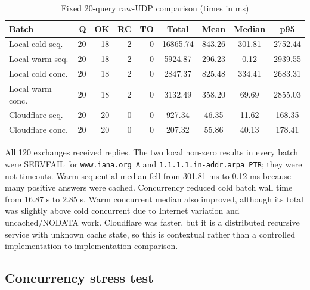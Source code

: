 \documentclass[11pt,a4paper]{article}
\newcommand{\code}[1]{\texttt{#1}}
\begin{document}
\begin{table}[htbp]
    \centering
    \scriptsize
    \setlength{\tabcolsep}{2.2pt}
    \caption{Fixed 20-query raw-UDP comparison (times in ms)}
    \label{tab:performance}
    \vspace{0.3em}

    \begin{tabular}{
        lrrrr
        S[table-format=5.2]
        S[table-format=4.2]
        S[table-format=4.2]
        S[table-format=4.2]
    }
        \toprule
        \textbf{Batch}
        & \textbf{Q}
        & \textbf{OK}
        & \textbf{RC}
        & \textbf{TO}
        & {\textbf{Total}}
        & {\textbf{Mean}}
        & {\textbf{Median}}
        & {\textbf{p95}} \\
        \midrule
        Local cold seq. & 20 & 18 & 2 & 0
            & 16865.74 & 843.26 & 301.81 & 2752.44 \\
        Local warm seq. & 20 & 18 & 2 & 0
            & 5924.87 & 296.23 & 0.12 & 2939.55 \\
        Local cold conc. & 20 & 18 & 2 & 0
            & 2847.37 & 825.48 & 334.41 & 2683.31 \\
        Local warm conc. & 20 & 18 & 2 & 0
            & 3132.49 & 358.20 & 69.69 & 2855.03 \\
        Cloudflare seq. & 20 & 20 & 0 & 0
            & 927.34 & 46.35 & 11.62 & 168.35 \\
        Cloudflare conc. & 20 & 20 & 0 & 0
            & 207.32 & 55.86 & 40.13 & 178.41 \\
        \bottomrule
    \end{tabular}
\end{table}

All 120 exchanges received replies. The two local non-zero results in every
batch were SERVFAIL for \code{www.iana.org A} and
\code{1.1.1.1.in-addr.arpa PTR}; they were not timeouts. Warm sequential median
fell from 301.81 ms to 0.12 ms because many positive answers were cached.
Concurrency reduced cold batch wall time from 16.87 s to 2.85 s. Warm concurrent
median also improved, although its total was slightly above cold concurrent due
to Internet variation and uncached/NODATA work. Cloudflare was faster, but it is
a distributed recursive service with unknown cache state, so this is contextual
rather than a controlled implementation-to-implementation comparison.

\subsection*{Concurrency stress test}
\end{document}
